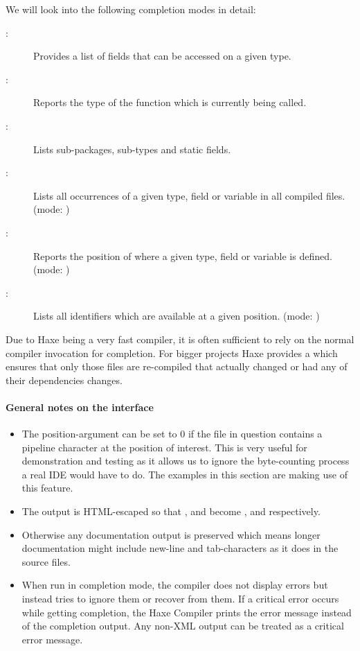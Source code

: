 We will look into the following completion modes in detail:

\begin{description}
	\item[:] Provides a list of fields that can be accessed on a given type.
	\item[:] Reports the type of the function which is currently being called.
	\item[:] Lists sub-packages, sub-types and static fields.
	\item[:] Lists all occurrences of a given type, field or variable in all compiled files. (mode: )
	\item[:] Reports the position of where a given type, field or variable is defined. (mode: )
	\item[:] Lists all identifiers which are available at a given position. (mode: )
\end{description}

Due to Haxe being a very fast compiler, it is often sufficient to rely on the normal compiler invocation for completion. For bigger projects Haxe provides a  which ensures that only those files are re-compiled that actually changed or had any of their dependencies changes.

\paragraph{General notes on the interface}
\label{cr-completion-interface-notes}

\begin{itemize}
	\item The position-argument can be set to 0 if the file in question contains a pipeline \ic{|} character at the position of interest. This is very useful for demonstration and testing as it allows us to ignore the byte-counting process a real IDE would have to do. The examples in this section are making use of this feature.
	\item The output is HTML-escaped so that \ic{\&}, \ic{<} and \ic{>} become ,  and  respectively.
	\item Otherwise any documentation output is preserved which means longer documentation might include new-line and tab-characters as it does in the source files.
	\item When run in completion mode, the compiler does not display errors but instead tries to ignore them or recover from them.  If a critical error occurs while getting completion, the Haxe Compiler prints the error message instead of the completion output. Any non-XML output can be treated as a critical error message.
\end{itemize}

